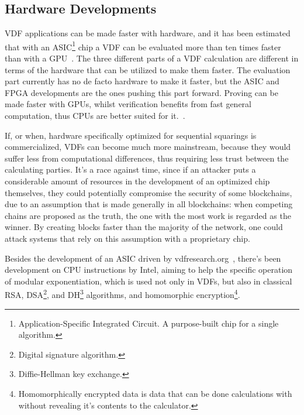 \subsection{Hardware Developments}
VDF applications can be made faster with hardware, and it has been estimated that with an ASIC\footnote{Application-Specific Integrated Circuit. A purpose-built chip for a single algorithm.} chip a VDF can be evaluated more than ten times faster than with a GPU~\cite{Stanford_Video2020-ap}.
The three different parts of a VDF calculation are different in terms of the hardware that can be utilized to make them faster. The evaluation part currently has no de facto hardware to make it faster, but the ASIC and FPGA developments are the ones pushing this part forward. Proving can be made faster with GPUs, whilst verification benefits from fast general computation, thus CPUs are better suited for it.~\cite{Protocol_Labs_Kelly_Olson2020-au}.

If, or when, hardware specifically optimized for sequential squarings is commercialized, VDFs can become much more mainstream, because they would suffer less from computational differences, thus requiring less trust between the calculating parties. It's a race against time, since if an attacker puts a considerable amount of resources in the development of an optimized chip themselves, they could potentially compromise the security of some blockchains, due to an assumption that is made generally in all blockchains: when competing chains are proposed as the truth, the one with the most work is regarded as the winner. By creating blocks faster than the majority of the network, one could attack systems that rely on this assumption with a proprietary chip.

Besides the development of an ASIC driven by vdfresearch.org~\cite{noauthor_undated-hk}, there's been development on CPU instructions by Intel, aiming to help the specific operation of modular exponentiation, which is used not only in VDFs, but also in classical RSA, DSA\footnote{Digital signature algorithm.}, and DH\footnote{Diffie-Hellman key exchange.} algorithms, and homomorphic encryption\footnote{Homomorphically encrypted data is data that can be done calculations with without revealing it's contents to the calculator.}.~\cite{Drucker2019-cx}

